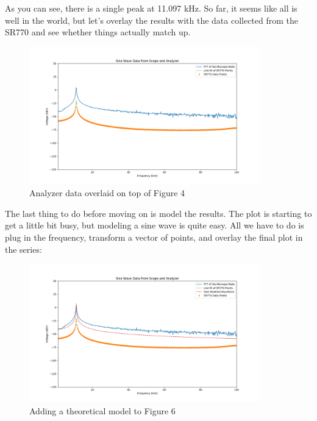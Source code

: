 \documentclass{article}
\begin{document}
As you can see, there is a single peak at 11.097 kHz. So far, it seems like all is well in the world, but let's overlay the results
with the data collected from the SR770 and see whether things actually match
up.

\begin{figure}[H]
    \centering
\begin{minipage}{11cm}
\begin{tcolorbox}
        \includegraphics[width=10cm, height=6.cm]{figures/figure5.png}
        \caption{Analyzer data overlaid on top of Figure 4}
        \label{fig:fig5}
\end{tcolorbox}
\end{minipage}
\end{figure}

The last thing to do before moving on is model the results. The plot is
starting to get a little bit busy, but modeling a sine wave is quite easy. All
we have to do is plug in the frequency, transform a vector of points, and
overlay the final plot in the series:

\begin{figure}[H]
    \centering
\begin{minipage}{11cm}
\begin{tcolorbox}
        \includegraphics[width=10cm, height=6cm]{figures/figure7.png}
        \caption{Adding a theoretical model to Figure 6}
        \label{fig:fig7}
\end{tcolorbox}
\end{minipage}
\end{figure}
\end{document}
